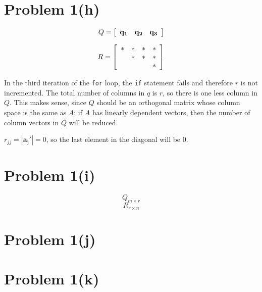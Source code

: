 \documentclass{article}
\newif\ifstays
\begin{document}
\ifstays
Here is how you would write the fill pattern for a $4\times 4$ identity matrix:
\[
I = \left[\begin{array}{*{4}c}
 \ast &  &  & \\
 & \ast &  & \\
 &  & \ast & \\
 &  &  & \ast
\end{array}\right]
\]
\fi

\section*{Problem 1(h)}

\[
Q = \left[\begin{array}{*{4}c}
 \mathbf{q_1} & \mathbf{q_2}  & \mathbf{q_3}\\
\end{array}\right]
\]

\[
R = \left[\begin{array}{*{4}c}
 \ast & \ast  & \ast & \ast\\
 & \ast & \ast & \ast\\
 &  &  &\ast  \\
\end{array}\right]
\]

In the third iteration of the \verb#for# loop, the \verb#if# statement fails and therefore $r$ is not incremented. The total number of columns in $q$ is $r$, so there is one less column in $Q$. This makes sense, since $Q$ should be an orthogonal matrix whose column space is the same as $A$; if $A$ has linearly dependent vectors, then the number of column vectors in $Q$ will be reduced.

$r_{jj} = |\mathbf{a_j'}| = 0$, so the last element in the diagonal will be 0.


\section*{Problem 1(i)}

$$Q_{m \times r}$$
$$R_{r \times n}$$

\section*{Problem 1(j)}

\section*{Problem 1(k)}
\end{document}
